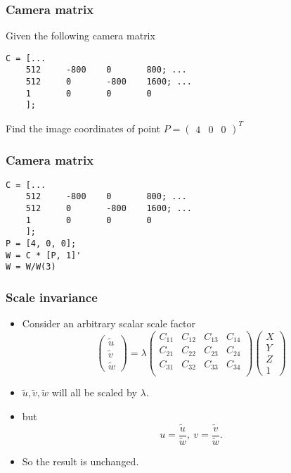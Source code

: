\begin{frame}[fragile]
\frametitle{Camera matrix}
Given the following camera matrix
\begin{lstlisting}
C = [...
    512     -800    0       800; ...
    512     0       -800    1600; ...
    1       0       0       0
    ];
\end{lstlisting}
Find the image coordinates of point $P = \left ( \begin{array}{ccc}
4 & 0 & 0 
\end{array}
\right )^{T}$
\end{frame}


\begin{frame}[fragile]
\frametitle{Camera matrix}
\begin{lstlisting}
C = [...
    512     -800    0       800; ...
    512     0       -800    1600; ...
    1       0       0       0
    ];
P = [4, 0, 0];
W = C * [P, 1]'
W = W/W(3)
\end{lstlisting}
\end{frame}

\begin{frame}
\frametitle{Scale invariance}
\begin{itemize}
\item Consider an arbitrary scalar scale factor
\[
\left (
\begin{array}{c}
\tilde{u} \\
\tilde{v} \\
\tilde{w}
\end{array}
\right )
=
\lambda
\left (
\begin{array}{cccc}
C_{11} & C_{12} & C_{13} & C_{14} \\
C_{21} & C_{22} & C_{23} & C_{24} \\
C_{31} & C_{32} & C_{33} & C_{34} \\
\end{array}
\right )
\left (
\begin{array}{c}
X \\
Y \\
Z \\
1
\end{array}
\right )
\]
\item $\tilde{u}, \tilde{v}, \tilde{w}$ will all be scaled by $\lambda$.
\item but
\[
u=\dfrac{\tilde{u}}{\tilde{w}},\ v = \dfrac{\tilde{v}}{\tilde{w}}.
\]
\item So the result is unchanged.
\end{itemize}
\end{frame}

